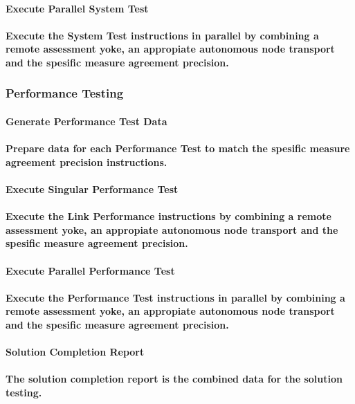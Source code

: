 \documentclass{acm_proc_article-sp}
\begin{document}
\paragraph{Execute Parallel System Test}
\paragraph{Execute the System Test instructions in parallel by combining a remote assessment yoke, an appropiate autonomous node transport and the spesific measure agreement precision.}
\subsubsection{Performance Testing}
\paragraph{Generate Performance Test Data}
\paragraph{Prepare data for each Performance Test to match the spesific measure agreement precision instructions.}
\paragraph{Execute Singular Performance Test}
\paragraph{Execute the Link Performance instructions by combining a remote assessment yoke, an appropiate autonomous node transport and the spesific measure agreement precision.}
\paragraph{Execute Parallel Performance Test}
\paragraph{Execute the Performance Test instructions in parallel by combining a remote assessment yoke, an appropiate autonomous node transport and the spesific measure agreement precision.}
\paragraph{Solution Completion Report}
\paragraph{The solution completion report is the combined data for the solution testing.}
\end{document}
